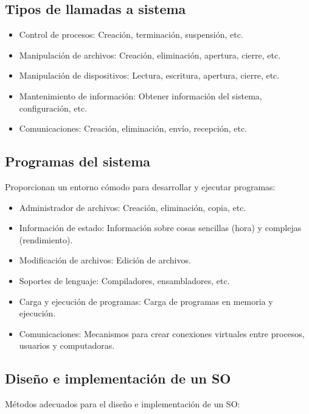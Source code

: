 \documentclass{templateNote}
\begin{document}
\subsection*{Tipos de llamadas a sistema}

\begin{itemize}
    \item Control de procesos: Creación, terminación, suspensión, etc.
    \item Manipulación de archivos: Creación, eliminación, apertura, cierre, etc.
    \item Manipulación de dispositivos: Lectura, escritura, apertura, cierre, etc.
    \item Mantenimiento de información: Obtener información del sistema, configuración, etc.
    \item Comunicaciones: Creación, eliminación, envío, recepción, etc.
\end{itemize}

\subsection*{Programas del sistema}

Proporcionan un entorno cómodo para desarrollar y ejecutar programas:
\begin{itemize}
    \item Administrador de archivos: Creación, eliminación, copia, etc. 
    \item Información de estado: Información sobre cosas sencillas (hora) y complejas (rendimiento).
    \item Modificación de archivos: Edición de archivos.
    \item Soportes de lenguaje: Compiladores, ensambladores, etc.
    \item Carga y ejecución de programas: Carga de programas en memoria y ejecución.
    \item Comunicaciones: Mecanismos para crear conexiones virtuales entre procesos, usuarios y computadoras.
\end{itemize}

\subsection*{Diseño e implementación de un SO}

Métodos adecuados para el diseño e implementación de un SO:
\end{document}
